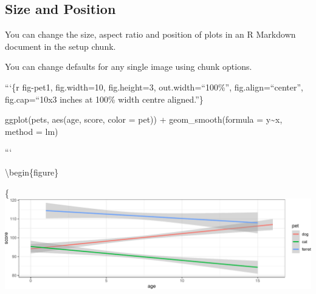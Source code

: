 \documentclass[
  oneside]{book}
\newenvironment{Shaded}{\begin{snugshade}}{\end{snugshade}}
\newcommand{\AttributeTok}[1]{\textcolor[rgb]{0.77,0.63,0.00}{#1}}
\newcommand{\CommentTok}[1]{\textcolor[rgb]{0.56,0.35,0.01}{\textit{#1}}}
\newcommand{\DecValTok}[1]{\textcolor[rgb]{0.00,0.00,0.81}{#1}}
\newcommand{\FunctionTok}[1]{\textcolor[rgb]{0.00,0.00,0.00}{#1}}
\newcommand{\NormalTok}[1]{#1}
\newcommand{\SpecialCharTok}[1]{\textcolor[rgb]{0.00,0.00,0.00}{#1}}
\newcommand{\StringTok}[1]{\textcolor[rgb]{0.31,0.60,0.02}{#1}}
\begin{document}
\hypertarget{custom-size}{%
\subsection{Size and Position}\label{custom-size}}

You can change the size, aspect ratio and position of plots in an R Markdown document in the setup chunk.

\begin{Shaded}
\end{Shaded}

You can change defaults for any single image using chunk options.

```\{r fig-pet1, fig.width=10, fig.height=3, out.width=``100\%'', fig.align=``center'', fig.cap=``10x3 inches at 100\% width centre aligned.''\}

\begin{Shaded}
\begin{Highlighting}[]
\FunctionTok{ggplot}\NormalTok{(pets, }\FunctionTok{aes}\NormalTok{(age, score, }\AttributeTok{color =}\NormalTok{ pet)) }\SpecialCharTok{+}
  \FunctionTok{geom\_smooth}\NormalTok{(}\AttributeTok{formula =}\NormalTok{ y}\SpecialCharTok{\textasciitilde{}}\NormalTok{x, }\AttributeTok{method =}\NormalTok{ lm)}
\end{Highlighting}
\end{Shaded}

```

\textbackslash begin\{figure\}

\{\centering \includegraphics[width=1\linewidth]{images/fig-chunk-example1-out-1}
\end{document}
